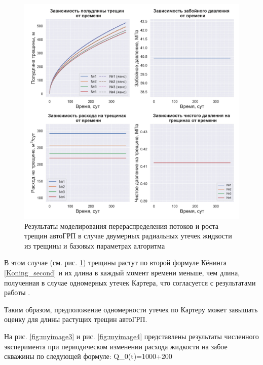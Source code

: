 \begin{figure}[H] 
\center
\includegraphics[width=.95\linewidth]{images/myimage2.jpg}
\caption{Результаты моделирования перераспределения потоков и роста трещин автоГРП в случае двумерных радиальных утечек жидкости из трещины и базовых параметрах алгоритма} 
\label{fig:myimage2}
\end{figure}

В этом случае (см. рис. \ref{fig:myimage2}) трещины растут по второй формуле Кёнинга \eqref{Koning_second} и их длина в каждый момент времени меньше, чем длина, полученная в случае одномерных утечек Картера, что согласуется с результатами работы \cite{hagoort}.

Таким образом, предположение одномерности утечек по Картеру \cite{karter} может завышать оценку для длины растущих трещин автоГРП.

На рис. \ref{fig:myimage3} и рис. \ref{fig:myimage4} представлены результаты численного эксперимента при периодическом изменении расхода жидкости на забое скважины по следующей формуле:
\vspace*{-5mm}
\beq
Q_0(t)=1000+200\cdot{}
\eeq

